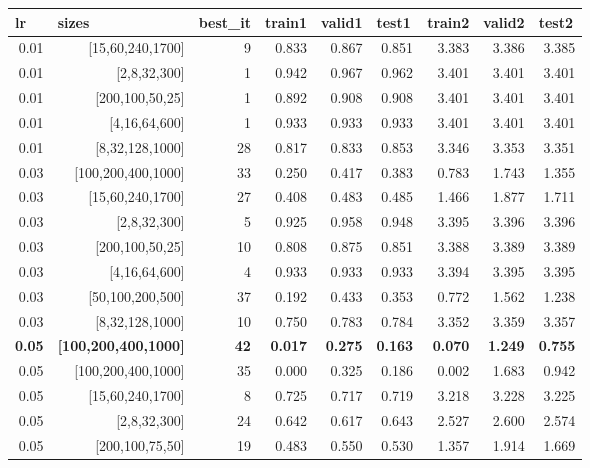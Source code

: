 \begin{table}[f]
\begin{tabular}{@{}rrrrrrrrr@{}}
\toprule
\multicolumn{1}{l}{lr} & \multicolumn{1}{l}{sizes} & \multicolumn{1}{l}{best\_it} & \multicolumn{1}{l}{train1} & \multicolumn{1}{l}{valid1} & \multicolumn{1}{l}{test1} & \multicolumn{1}{l}{train2} & \multicolumn{1}{l}{valid2} & \multicolumn{1}{l}{test2} \\ \midrule
0.01 & {[}15,60,240,1700{]} & 9 & 0.833 & 0.867 & 0.851 & 3.383 & 3.386 & 3.385 \\
0.01 & {[}2,8,32,300{]} & 1 & 0.942 & 0.967 & 0.962 & 3.401 & 3.401 & 3.401 \\
0.01 & {[}200,100,50,25{]} & 1 & 0.892 & 0.908 & 0.908 & 3.401 & 3.401 & 3.401 \\
0.01 & {[}4,16,64,600{]} & 1 & 0.933 & 0.933 & 0.933 & 3.401 & 3.401 & 3.401 \\
0.01 & {[}8,32,128,1000{]} & 28 & 0.817 & 0.833 & 0.853 & 3.346 & 3.353 & 3.351 \\
0.03 & {[}100,200,400,1000{]} & 33 & 0.250 & 0.417 & 0.383 & 0.783 & 1.743 & 1.355 \\
0.03 & {[}15,60,240,1700{]} & 27 & 0.408 & 0.483 & 0.485 & 1.466 & 1.877 & 1.711 \\
0.03 & {[}2,8,32,300{]} & 5 & 0.925 & 0.958 & 0.948 & 3.395 & 3.396 & 3.396 \\
0.03 & {[}200,100,50,25{]} & 10 & 0.808 & 0.875 & 0.851 & 3.388 & 3.389 & 3.389 \\
0.03 & {[}4,16,64,600{]} & 4 & 0.933 & 0.933 & 0.933 & 3.394 & 3.395 & 3.395 \\
0.03 & {[}50,100,200,500{]} & 37 & 0.192 & 0.433 & 0.353 & 0.772 & 1.562 & 1.238 \\
0.03 & {[}8,32,128,1000{]} & 10 & 0.750 & 0.783 & 0.784 & 3.352 & 3.359 & 3.357 \\
\textbf{0.05} & \textbf{{[}100,200,400,1000{]}} & \textbf{42} & \textbf{0.017} & \textbf{0.275} & \textbf{0.163} & \textbf{0.070} & \textbf{1.249} & \textbf{0.755} \\
0.05 & {[}100,200,400,1000{]} & 35 & 0.000 & 0.325 & 0.186 & 0.002 & 1.683 & 0.942 \\
0.05 & {[}15,60,240,1700{]} & 8 & 0.725 & 0.717 & 0.719 & 3.218 & 3.228 & 3.225 \\
0.05 & {[}2,8,32,300{]} & 24 & 0.642 & 0.617 & 0.643 & 2.527 & 2.600 & 2.574 \\
0.05 & {[}200,100,75,50{]} & 19 & 0.483 & 0.550 & 0.530 & 1.357 & 1.914 & 1.669 \\

\end{tabular}
\end{table}
